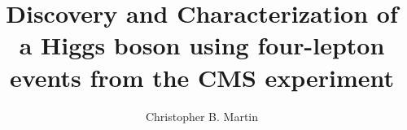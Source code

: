 \documentclass[12pt,twoside,final]{thesis}
\begin{document}
\title{Discovery and Characterization of a Higgs boson using four-lepton events from the CMS experiment}
\author{Christopher B. Martin}
\dissertation
\doctorphilosophy
\copyrightnotice










%





\begin{vita}
%
\end{vita}
\end{document}
